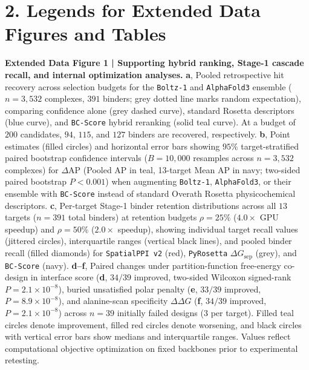 \documentclass[11pt]{article}
\begin{document}
\section*{2. Legends for Extended Data Figures and Tables}

\textbf{Extended Data Figure 1 | Supporting hybrid ranking, Stage-1 cascade recall, and internal optimization analyses.}
\textbf{a}, Pooled retrospective hit recovery across selection budgets for the \texttt{Boltz-1} and \texttt{AlphaFold3} ensemble ($n = 3,532$ complexes, $391$ binders; grey dotted line marks random expectation), comparing confidence alone (grey dashed curve), standard Rosetta descriptors (blue curve), and \texttt{BC-Score} hybrid reranking (solid teal curve). At a budget of $200$ candidates, $94$, $115$, and $127$ binders are recovered, respectively.
\textbf{b}, Point estimates (filled circles) and horizontal error bars showing $95\%$ target-stratified paired bootstrap confidence intervals ($B = 10,000$ resamples across $n = 3,532$ complexes) for $\Delta\text{AP}$ (Pooled AP in teal, 13-target Mean AP in navy; two-sided paired bootstrap $P < 0.001$) when augmenting \texttt{Boltz-1}, \texttt{AlphaFold3}, or their ensemble with \texttt{BC-Score} instead of standard Overath Rosetta physicochemical descriptors.
\textbf{c}, Per-target Stage-1 binder retention distributions across all $13$ targets ($n = 391$ total binders) at retention budgets $\rho = 25\%$ ($4.0\times$ GPU speedup) and $\rho = 50\%$ ($2.0\times$ speedup), showing individual target recall values (jittered circles), interquartile ranges (vertical black lines), and pooled binder recall (filled diamonds) for \texttt{SpatialPPI v2} (red), \texttt{PyRosetta} $\Delta G_{\text{sep}}$ (grey), and \texttt{BC-Score} (navy).
\textbf{d--f}, Paired changes under partition-function free-energy co-design in interface score (\textbf{d}, $34/39$ improved, two-sided Wilcoxon signed-rank $P = 2.1\times 10^{-8}$), buried unsatisfied polar penalty (\textbf{e}, $33/39$ improved, $P = 8.9\times 10^{-8}$), and alanine-scan specificity $\Delta\Delta G$ (\textbf{f}, $34/39$ improved, $P = 2.1\times 10^{-8}$) across $n = 39$ initially failed designs ($3$ per target). Filled teal circles denote improvement, filled red circles denote worsening, and black circles with vertical error bars show medians and interquartile ranges. Values reflect computational objective optimization on fixed backbones prior to experimental retesting.
\end{document}
